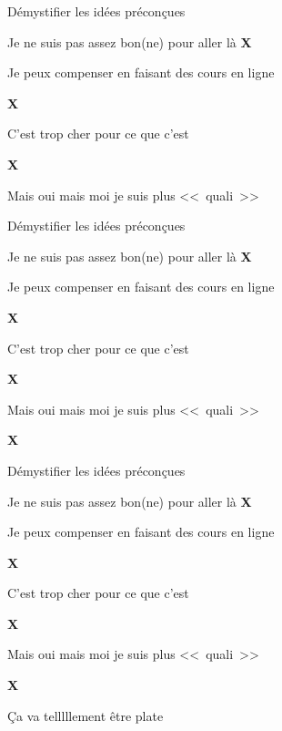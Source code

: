 \documentclass{beamer}
\begin{document}
\begin{frame}{Démystifier les idées préconçues}
\begin{itemize}
    \item Je ne suis pas assez bon(ne) pour aller là \Large{\textbf{\color{red}X}}
    \normalsize{\item Je peux compenser en faisant des cours en ligne} \Large{\textbf{\color{red}X}}
    \normalsize{\item C'est trop cher pour ce que c'est} \Large{\textbf{\color{red}X}}
    \normalsize{\item Mais oui mais moi je suis plus <<~quali~>>} %
\end{itemize}
\end{frame}

\begin{frame}{Démystifier les idées préconçues}
\begin{itemize}
    \item Je ne suis pas assez bon(ne) pour aller là \Large{\textbf{\color{red}X}}
    \normalsize{\item Je peux compenser en faisant des cours en ligne} \Large{\textbf{\color{red}X}}
    \normalsize{\item C'est trop cher pour ce que c'est} \Large{\textbf{\color{red}X}}
    \normalsize{\item Mais oui mais moi je suis plus <<~quali~>>} \Large{\textbf{\color{red}X}}
\end{itemize}
\end{frame}

\begin{frame}{Démystifier les idées préconçues}
\begin{itemize}
    \item Je ne suis pas assez bon(ne) pour aller là \Large{\textbf{\color{red}X}}
    \normalsize{\item Je peux compenser en faisant des cours en ligne} \Large{\textbf{\color{red}X}}
    \normalsize{\item C'est trop cher pour ce que c'est} \Large{\textbf{\color{red}X}}
    \normalsize{\item Mais oui mais moi je suis plus <<~quali~>>} \Large{\textbf{\color{red}X}}
     \normalsize{\item Ça va telllllement être plate} %
\end{itemize}
\end{frame}
\end{document}
